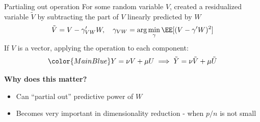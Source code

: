 \documentclass[compress, 8pt]{beamer}
\begin{document}
\begin{frame}{Partialing out operation}
    For some random variable $V$, created a residualized variable $\tilde{V}$ by subtracting the part of $V$ linearly predicted by $W$
    \begin{equation*}
        \tilde{V} = V - \gamma_{VW}^\prime W, \quad \gamma_{VW} = \arg \min_{\gamma} \EE [(V - \gamma^\prime W)^2]
    \end{equation*}
    If $V$ is a vector, applying the operation to each component:
    \begin{equation*}
        {\color{MainBlue}Y = \nu V + \mu U} \implies \tilde{Y} = \nu \tilde{V} + \mu \tilde{U}
    \end{equation*}

    \vspace{1ex}
    \textbf{Why does this matter?}
    \begin{itemize}
        \item Can ``partial out'' predictive power of $W$
        \item Becomes very important in dimensionality reduction - when $p/n$ is not small
    \end{itemize}

\end{frame}
\end{document}
